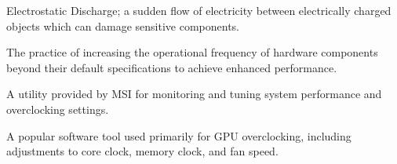 \documentclass{article}
\begin{document}
\begin{description}[style=multiline, labelwidth=3cm, leftmargin=!, itemsep=5pt]
    \item[ESD] Electrostatic Discharge; a sudden flow of electricity between electrically charged objects which can damage sensitive components.
    \item[Overclocking] The practice of increasing the operational frequency of hardware components beyond their default specifications to achieve enhanced performance.
    \item[MSI Command Center] A utility provided by MSI for monitoring and tuning system performance and overclocking settings.
    \item[MSI Afterburner] A popular software tool used primarily for GPU overclocking, including adjustments to core clock, memory clock, and fan speed.
\end{description}
\end{document}
